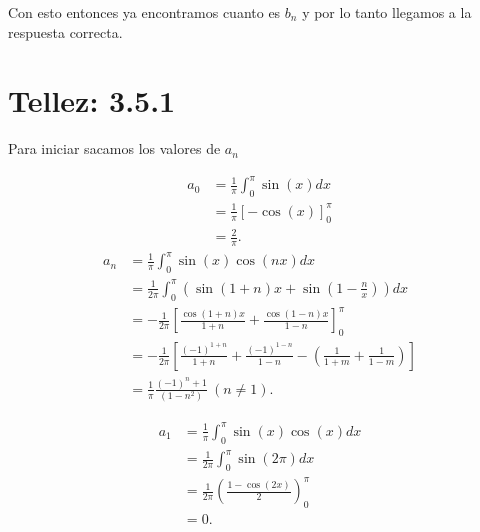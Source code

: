 \documentclass{report}
\begin{document}
Con esto entonces ya encontramos cuanto es $b_n$ y por lo tanto llegamos a la respuesta correcta.

\chapter{Tellez: 3.5.1}

Para iniciar sacamos los valores de $a_n$

\begin{align*}
  a_0 &= \frac{1}{\pi}\int_{0}^{\pi}\sin\left( x \right) dx \\
  &= \frac{1}{\pi}\left[ -\cos\left( x \right)  \right]_{0}^{\pi} \\
  &= \frac{2}{\pi}.
\end{align*}
\begin{align*}
  a_n &= \frac{1}{\pi}\int_{0}^{\pi}\sin\left( x \right) \cos\left( nx \right) dx \\
  &= \frac{1}{2\pi} \int_{0}^{\pi}\left( \sin\left( 1 + n \right) x + \sin\left( 1 - \frac{n}{x} \right)  \right) dx \\
  &= -\frac{1}{2\pi}\left[ \frac{\cos\left( 1 + n \right) x}{1 + n} + \frac{\cos\left( 1 - n \right) x}{1 - n} \right]_{0}^{\pi} \\
  &= - \frac{1}{2\pi}\left[ \frac{\left( -1 \right)^{1 + n}}{1 + n} + \frac{\left( -1 \right)^{1 - n}}{1 - n} - \left( \frac{1}{1 + m} + \frac{1}{1 - m} \right)  \right]  \\
  &= \frac{1}{\pi}\frac{\left( -1 \right)^{n} + 1}{\left( 1 - n^2 \right) }\ \left( n \neq 1 \right).
\end{align*}

\begin{align*}
  a_1 &= \frac{1}{\pi}\int_{0}^{\pi}\sin\left( x \right) \cos\left( x \right) dx \\
  &= \frac{1}{2\pi}\int_{0}^{\pi} \sin\left( 2\pi \right) dx \\
  &= \frac{1}{2\pi}\left( \frac{1 - \cos\left( 2x \right) }{2} \right)_{0}^{\pi} \\
  &= 0
.\end{align*}
\end{document}
